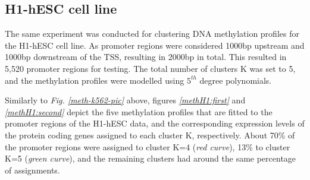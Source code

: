 \subsection{H1-hESC cell line} \label{meth-encode-h1-subsect}
The same experiment was conducted for clustering DNA methylation profiles for the H1-hESC cell line. As promoter regions were considered 1000bp upstream and 1000bp downstream of the TSS, resulting in 2000bp in total. This resulted in 5,520 promoter regions for testing. The total number of clusters K was set to 5, and the methylation profiles were modelled using $5^{th}$ degree polynomials. 

Similarly to \emph{Fig. \ref{meth-k562-pic}} above, figures \emph{\ref{methH1:first}} and \emph{\ref{methH1:second}} depict the five methylation profiles that are fitted to the promoter regions of the H1-hESC data, and the corresponding expression levels of the protein coding genes assigned to each cluster K, respectively. About 70\% of the promoter regions were assigned to cluster K=4 (\emph{red curve}), 13\% to cluster K=5 (\emph{green curve}), and the remaining clusters had around the same percentage of assignments. 

